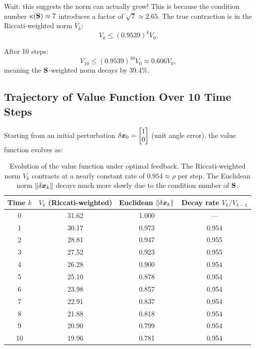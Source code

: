 Wait: this suggests the norm can actually grow! This is because the condition number $\kappa(\mathbf{S}) \approx 7$ introduces
a factor of $\sqrt{7} \approx 2.65$. The true contraction is in the Riccati-weighted norm $V_k$:
\begin{equation}
V_k \leq (0.9539)^k V_0.
\label{eq:ch6:V-decay}
\end{equation}

After 10 steps:
\begin{equation}
V_{10} \leq (0.9539)^{10} V_0 \approx 0.606 V_0,
\label{eq:ch6:V10}
\end{equation}
meaning the $\mathbf{S}$-weighted norm decays by 39.4\%.

\subsection{Trajectory of Value Function Over 10 Time Steps}

Starting from an initial perturbation $\delta\bm{x}_0 = \begin{bmatrix} 1 \\ 0 \end{bmatrix}$ (unit angle error), the value function evolves as:

\begin{table}[h]
\centering
\begin{tabular}{|c|c|c|c|}
\hline
Time $k$ & $V_k$ (Riccati-weighted) & Euclidean $\left\lVert \delta\bm{x}_k \right\rVert$ & Decay rate $V_k/V_{k-1}$ \\
\hline
0 & 31.62 & 1.000 & --- \\
1 & 30.17 & 0.973 & 0.954 \\
2 & 28.81 & 0.947 & 0.955 \\
3 & 27.52 & 0.923 & 0.955 \\
4 & 26.28 & 0.900 & 0.954 \\
5 & 25.10 & 0.878 & 0.954 \\
6 & 23.98 & 0.857 & 0.954 \\
7 & 22.91 & 0.837 & 0.954 \\
8 & 21.88 & 0.818 & 0.954 \\
9 & 20.90 & 0.799 & 0.954 \\
10 & 19.96 & 0.781 & 0.954 \\
\hline
\end{tabular}
\caption{Evolution of the value function under optimal feedback. The Riccati-weighted norm $V_k$ contracts at
         a nearly constant rate of $0.954 \approx \rho$ per step. The Euclidean norm $\left\lVert \delta\bm{x}_k \right\rVert$ decays much
         more slowly due to the condition number of $\mathbf{S}$.}
\label{tab:ch6:value-trajectory}
\end{table}

